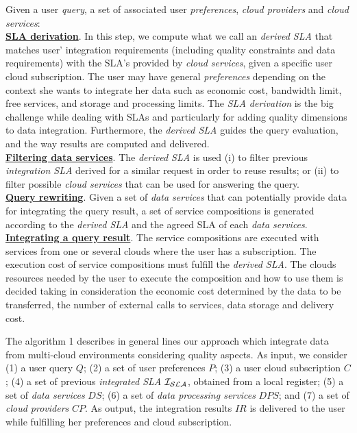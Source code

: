 Given a user \textit{query}, a set of associated user \textit{preferences}, \textit{cloud providers} and \textit{cloud services}:
\\
\textbf{\underline{SLA derivation}}. In this step, we compute what we call an \textsl{derived SLA} that matches user' integration requirements (including quality constraints and data requirements) with the SLA's provided by \textit{cloud services}, given a specific user cloud subscription. The user may have general \textit{preferences} depending on the context she wants to integrate her data such as economic cost, bandwidth limit, free services, and storage and processing limits. The \textit{SLA derivation} is the big challenge while dealing with SLAs and particularly for adding quality dimensions to data integration. Furthermore, the \textsl{derived SLA} guides the query evaluation, and the way results are computed and delivered. \\
\textbf{\underline{Filtering data services}}. The \textsl{derived SLA} is used (i)
to filter previous \textsl{integration SLA} derived for a similar request in order to reuse results; or (ii) to filter possible \textit{cloud services} that can be used for answering the query. \\ %
\textbf{\underline{Query rewriting}}. Given a set of \textit{data services} that can
potentially provide data for integrating the query result, a set of service compositions is generated according to the \textsl{derived SLA} and the agreed SLA of each \textit{data services}. \\
\textbf{\underline{Integrating a query result}}. The service compositions are
executed with services from one or several clouds where the user has a
subscription.
The execution cost of service compositions must fulfill the \textsl{derived
SLA}. The clouds resources needed by the user to execute the composition and how
to use them is decided taking in consideration the economic cost determined by
the data to be transferred, the number of external calls to services, data storage and delivery cost.

The algorithm 1 describes in general lines our approach which integrate data
from multi-cloud environments considering quality aspects.
%
As input, we consider (1) a user query $Q$; (2) a set of user preferences $P$;
(3) a user cloud subscription $C$; (4) a set of previous \textit{integrated SLA}
$\bigSLA$, obtained from a local register; (5) a set of \textit{data services}
$DS$; (6) a set of \textit{data processing services} $DPS$; and (7) a set of \textit{cloud providers} $CP$. As output, the integration results $IR$ is delivered to the user while fulfilling her preferences and cloud subscription.
%
 
